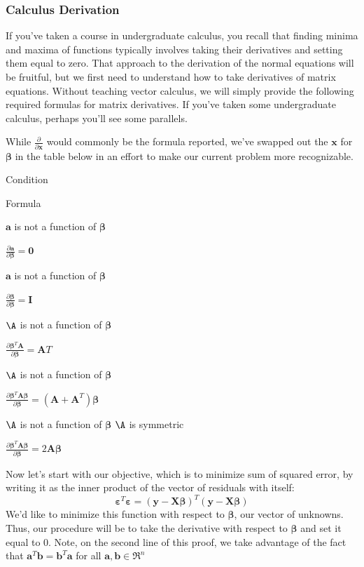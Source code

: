 \documentclass[
]{article}
\theoremstyle{definition}
\theoremstyle{definition}
\theoremstyle{definition}
\theoremstyle{definition}
\theoremstyle{remark}
\begin{document}
\hypertarget{calculus-derivation}{%
\subsubsection{Calculus Derivation}\label{calculus-derivation}}

If you've taken a course in undergraduate calculus, you recall that finding minima and maxima of functions typically involves taking their derivatives and setting them equal to zero. That approach to the derivation of the normal equations will be fruitful, but we first need to understand how to take derivatives of matrix equations. Without teaching vector calculus, we will simply provide the following required formulas for matrix derivatives. If you've taken some undergraduate calculus, perhaps you'll see some parallels.

While \(\frac{\partial}{\partial \mathbf{x}}\) would commonly be the formula reported, we've swapped out the \(\mathbf{x}\) for \(\boldsymbol \beta\) in the table below in an effort to make our current problem more recognizable.

Condition

Formula

\(\mathbf{a}\) is not a function of \(\boldsymbol \beta\)

\(\frac{\partial \mathbf{a}}{\partial \boldsymbol \beta}= \mathbf{0}\)

\(\mathbf{a}\) is not a function of \(\boldsymbol \beta\)

\(\frac{\partial \boldsymbol \beta}{\partial \boldsymbol \beta}= \mathbf{I}\)

\(\A\) is not a function of \(\boldsymbol \beta\)

\(\frac{\partial \boldsymbol \beta^T\mathbf{A}}{\partial \boldsymbol \beta}= \mathbf{A}T\)

\(\A\) is not a function of \(\boldsymbol \beta\)

\(\frac{\partial \boldsymbol \beta^T\mathbf{A}\boldsymbol \beta}{\partial \boldsymbol \beta}= (\mathbf{A}+\mathbf{A}^T)\boldsymbol \beta\)

\(\A\) is not a function of \(\boldsymbol \beta\) \(\A\) is symmetric

\(\frac{\partial \boldsymbol \beta^T\mathbf{A}\boldsymbol \beta}{\partial \boldsymbol \beta}= 2\mathbf{A}\boldsymbol \beta\)

Now let's start with our objective, which is to minimize sum of squared error, by writing it as the inner product of the vector of residuals with itself:
\[\boldsymbol \varepsilon^T \boldsymbol \varepsilon = (\mathbf{y}-\mathbf{X}\boldsymbol \beta)^T(\mathbf{y}-\mathbf{X}\boldsymbol \beta)\]
We'd like to minimize this function with respect to \(\boldsymbol \beta\), our vector of unknowns. Thus, our procedure will be to take the derivative with respect to \(\boldsymbol \beta\) and set it equal to 0. Note, on the second line of this proof, we take advantage of the fact that \(\mathbf{a}^T\mathbf{b} = \mathbf{b}^T\mathbf{a}\) for all \(\mathbf{a},\mathbf{b} \in \Re^n\)
\end{document}
